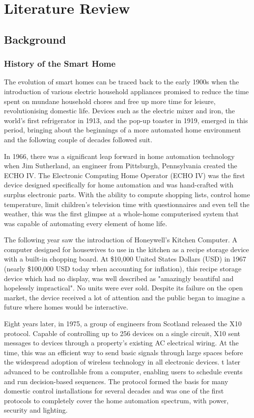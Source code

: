 \chapter{Literature Review}\label{ch:lit_review}

\section{Background}

\subsection{History of the Smart Home}
The evolution of smart homes can be traced back to the early 1900s when the introduction of various electric household appliances promised to reduce the time spent on mundane household chores and free up more time for leisure, revolutionising domestic life.
Devices such as the electric mixer and iron, the world's first refrigerator in 1913, and the pop-up toaster in 1919, emerged in this period, bringing about the beginnings of a more automated home environment and the following couple of decades followed suit.

In 1966, there was a significant leap forward in home automation technology when Jim Sutherland, an engineer from Pittsburgh, Pennsylvania created the ECHO IV.
The Electronic Computing Home Operator (ECHO IV) was the first device designed specifically for home automation and was hand-crafted with surplus electronic parts.
With the ability to compute shopping lists, control home temperature, limit children's television time with questionnaires and even tell the weather, this was the first glimpse at a whole-home computerised system that was capable of automating every element of home life.

The following year saw the introduction of Honeywell's Kitchen Computer. A computer designed for housewives to use in the kitchen as a recipe storage device with a built-in chopping board.
At \$10,000 United States Dollars (USD) in 1967 (nearly \$100,000 USD today when accounting for inflation), this recipe storage device which had no display, was well described as "amazingly beautiful and hopelessly impractical".
No units were ever sold.
Despite its failure on the open market, the device received a lot of attention and the public began to imagine a future where homes would be interactive.

Eight years later, in 1975, a group of engineers from Scotland released the X10 protocol.
Capable of controlling up to 256 devices on a single circuit, X10 sent messages to devices through a property's existing AC electrical wiring.
At the time, this was an efficient way to send basic signals through large spaces before the widespread adoption of wireless technology in all electronic devices.
t later advanced to be controllable from a computer, enabling users to schedule events and run decision-based sequences.
The protocol formed the basis for many domestic control installations for several decades and was one of the first protocols to completely cover the home automation spectrum, with power, security and lighting.

